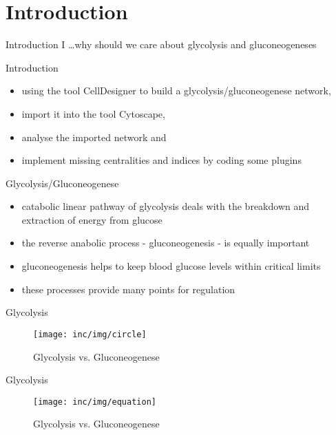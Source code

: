 \section{Introduction}
\begin{frame}{Introduction I}
\dots why should we care about glycolysis and gluconeogeneses
\end{frame}

\begin{frame}{Introduction}
	\begin{itemize}
		\item using the tool CellDesigner to build a glycolysis/gluconeogenese network,
		\item import it into the tool Cytoscape,
		\item analyse the imported network and
		\item implement missing centralities and indices by coding some plugins
	\end{itemize}
\end{frame}

\begin{frame}{Glycolysis/Gluconeogenese}
	\begin{itemize}
		\item catabolic linear pathway of glycolysis deals with the breakdown and extraction of energy from glucose
		\item the reverse anabolic process - gluconeogenesis - is equally important
		\item gluconeogenesis helps to keep blood glucose levels within critical limits
		\item these processes provide many points for regulation
	\end{itemize}
\end{frame}

\begin{frame}{Glycolysis}
	\begin{figure}[htbp]
	   \centering
	   \texttt{[image: inc/img/circle]}
	   \caption{Glycolysis vs. Gluconeogenese}
	   \label{fig:circle}
	\end{figure}
\end{frame}

\begin{frame}{Glycolysis}
	\begin{figure}[htbp]
	   \centering
	   \texttt{[image: inc/img/equation]}
	   \caption{Glycolysis vs. Gluconeogenese}
	   \label{fig:circle}
	\end{figure}
\end{frame}

